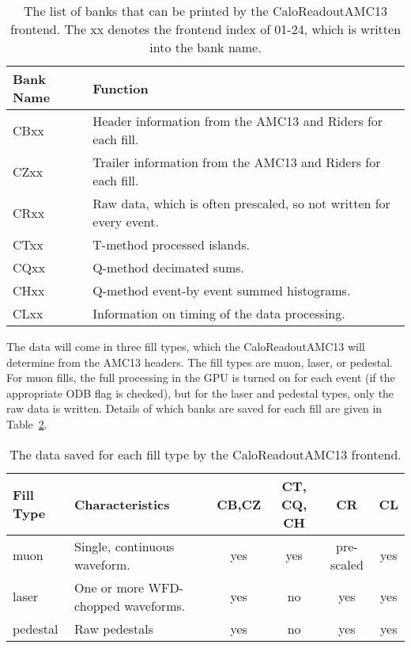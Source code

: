 \begin{table}
\begin{tabular}{|l|l|}
\hline
Bank Name & Function\\
\hline
CBxx & Header information from the AMC13 and Riders for each fill.\\
CZxx & Trailer information from the AMC13 and Riders for each fill.\\
CRxx & Raw data, which is often prescaled, so not written for every event.\\
CTxx & T-method processed islands.\\
CQxx & Q-method decimated sums.\\
CHxx & Q-method event-by event summed histograms.\\
CLxx & Information on timing of the data processing.\\
\hline
\end{tabular}
\caption{\label{tab:banks}The list of banks that can be printed by the CaloReadoutAMC13 frontend. The xx denotes the frontend index of 01-24, which is written into the bank name.}
\end{table}

The data will come in three fill types, which the CaloReadoutAMC13 will determine from the AMC13 headers. The fill types are muon, laser, or pedestal. For muon fills, the full processing in the GPU is turned on for each event (if the appropriate ODB flag is checked), but for the laser and pedestal types, only the raw data is written. Details of which banks are saved for each fill are given in Table~\ref{tab:fills}.

\begin{table}
\begin{tabular}{|l|l|c|c|c|c|}
\hline
Fill Type & Characteristics & CB,CZ & CT, CQ, CH & CR & CL\\
\hline
muon & Single, continuous waveform. & yes & yes & pre-scaled & yes\\
\hline
laser & \multicolumn{1}{m{5cm}|}{One or more WFD-chopped waveforms.} & yes & no & yes & yes\\
\hline
pedestal & \multicolumn{1}{m{3cm}|}{Raw pedestals} & yes & no & yes & yes\\
\hline
\end{tabular}
\caption{\label{tab:fills}The data saved for each fill type by the CaloReadoutAMC13 frontend.}
\end{table}

